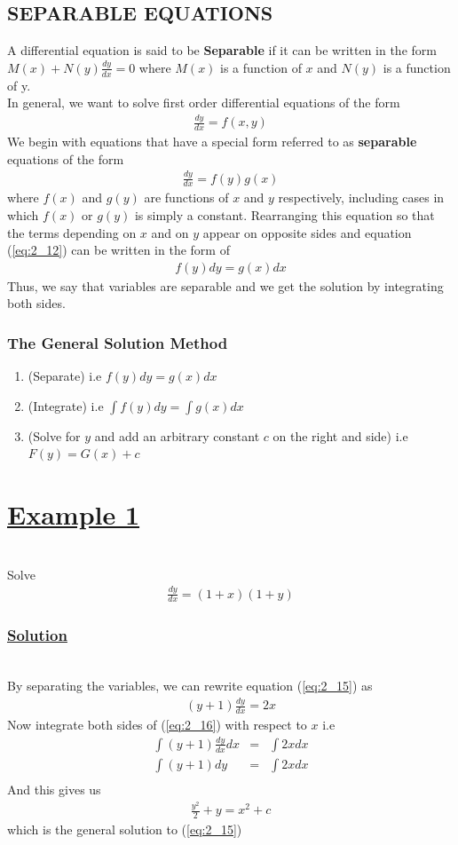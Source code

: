\documentclass[11pt]{report}
\newcommand{\ubt}[1]{\textbf{\underline{#1}}}
\newcommand{\sps}{\\[0.2cm]}
\newcommand{\spn}[1]{\\[#1cm]}
\newcommand{\refn}[1]{(\ref{#1})}
\newcommand{\refx}[1]{\refn{eq:#1}}
\newcommand{\bt}[1]{\textbf{#1}}
\newcommand{\dsp}{\displaystyle}
\newcommand{\example}[1]{\section*{\ubt{Example #1}}{~}\spn{-1}}
\newcommand{\solution}{\subsubsection{\ubt{Solution}}{~}\spn{-1}}
\renewcommand{\labelenumi}{\arabic{enumi})}
\begin{document}
	\subsection{SEPARABLE EQUATIONS}
	A differential equation is said to be \bt{Separable} if it can be written in the form $M(x) + N(y)\frac{dy}{dx}=0$ where $M(x)$ is a function of $x$ and $N(y)$ is a function of y.\sps
	In general, we want to solve first order differential equations of the form
	\begin{eqnarray}
		\frac{dy}{dx} = f(x,y)\label{eq:2_11}
	\end{eqnarray}
	We begin with equations that have a special form referred to as \bt{separable} equations of the form
	\begin{eqnarray}
		\frac{dy}{dx} = f(y)g(x)\label{eq:2_12}
	\end{eqnarray}
	where $f(x)$ and $g(y)$ are functions of $x$ and $y$ respectively, including cases in which $f(x)$ or $g(y)$ is simply a constant. Rearranging this equation so that the terms depending on $x$ and on $y$ appear on opposite sides and equation \refx{2_12} can be written in the form of
	\begin{eqnarray}
		f(y)dy = g(x)dx
	\end{eqnarray}
	 Thus, we say that variables are separable and we get the solution by integrating both sides.
	
	\subsubsection{The General Solution Method}
	\begin{enumerate}
		\renewcommand{\labelenumi}{Step \arabic{enumi}:}
		\item (Separate) i.e $\dsp f(y)dy = g(x)dx$
		
		\item (Integrate) i.e $\dsp\int f(y)dy = \int g(x)dx$
		
		\item (Solve for $y$ and add an arbitrary constant $c$ on the right and side) i.e $F(y) = G(x) + c$
	\end{enumerate}
	
	\example{1}
	Solve\spn{-1.3}
	\begin{eqnarray}
		\frac{dy}{dx} = (1+x)(1+y)\label{eq:2_15}
	\end{eqnarray}
	
	\solution
	By separating the variables, we can rewrite equation \refx{2_15} as
	\begin{eqnarray}
		(y+1)\frac{dy}{dx} = 2x\label{eq:2_16}
	\end{eqnarray}
	Now integrate both sides of \refx{2_16} with respect to $x$ i.e
	\begin{eqnarray*}
		\int (y+1)\frac{dy}{dx}dx &=& \int 2x dx\sps
		\int (y+1)dy &=& \int 2x dx\sps
	\end{eqnarray*}
	And this gives us
	\begin{eqnarray*}
		\frac{y^2}{2} + y = x^2 + c
	\end{eqnarray*}
	which is the general solution to \refx{2_15}
	
\end{document}
